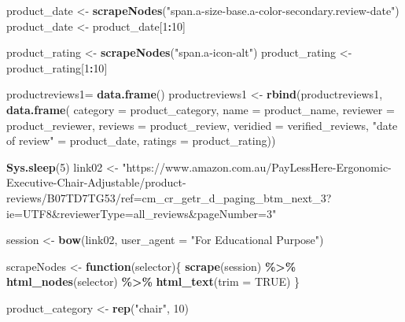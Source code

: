 \documentclass[
]{article}
\newenvironment{Shaded}{\begin{snugshade}}{\end{snugshade}}
\newcommand{\AttributeTok}[1]{\textcolor[rgb]{0.13,0.29,0.53}{#1}}
\newcommand{\ConstantTok}[1]{\textcolor[rgb]{0.56,0.35,0.01}{#1}}
\newcommand{\ControlFlowTok}[1]{\textcolor[rgb]{0.13,0.29,0.53}{\textbf{#1}}}
\newcommand{\DecValTok}[1]{\textcolor[rgb]{0.00,0.00,0.81}{#1}}
\newcommand{\FunctionTok}[1]{\textcolor[rgb]{0.13,0.29,0.53}{\textbf{#1}}}
\newcommand{\NormalTok}[1]{#1}
\newcommand{\OtherTok}[1]{\textcolor[rgb]{0.56,0.35,0.01}{#1}}
\newcommand{\SpecialCharTok}[1]{\textcolor[rgb]{0.81,0.36,0.00}{\textbf{#1}}}
\newcommand{\StringTok}[1]{\textcolor[rgb]{0.31,0.60,0.02}{#1}}
\begin{document}
\begin{Shaded}
\begin{Highlighting}[]
\NormalTok{  product\_date }\OtherTok{\textless{}{-}} \FunctionTok{scrapeNodes}\NormalTok{(}\StringTok{"span.a{-}size{-}base.a{-}color{-}secondary.review{-}date"}\NormalTok{)}
\NormalTok{  product\_date }\OtherTok{\textless{}{-}}\NormalTok{ product\_date[}\DecValTok{1}\SpecialCharTok{:}\DecValTok{10}\NormalTok{]}
  
\NormalTok{  product\_rating }\OtherTok{\textless{}{-}} \FunctionTok{scrapeNodes}\NormalTok{(}\StringTok{"span.a{-}icon{-}alt"}\NormalTok{)}
\NormalTok{  product\_rating }\OtherTok{\textless{}{-}}\NormalTok{ product\_rating[}\DecValTok{1}\SpecialCharTok{:}\DecValTok{10}\NormalTok{]}
  
\NormalTok{  productreviews1}\OtherTok{=} \FunctionTok{data.frame}\NormalTok{()}
\NormalTok{  productreviews1 }\OtherTok{\textless{}{-}} \FunctionTok{rbind}\NormalTok{(productreviews1, }\FunctionTok{data.frame}\NormalTok{(}
                      \AttributeTok{category =}\NormalTok{ product\_category,}
                      \AttributeTok{name =}\NormalTok{ product\_name,}
                      \AttributeTok{reviewer =}\NormalTok{ product\_reviewer,}
                      \AttributeTok{reviews =}\NormalTok{ product\_review,}
                      \AttributeTok{veridied =}\NormalTok{ verified\_reviews,}
                      \StringTok{"date of review"} \OtherTok{=}\NormalTok{ product\_date,}
                      \AttributeTok{ratings =}\NormalTok{ product\_rating))}

  
 \FunctionTok{Sys.sleep}\NormalTok{(}\DecValTok{5}\NormalTok{)}
\NormalTok{link02 }\OtherTok{\textless{}{-}} \StringTok{"https://www.amazon.com.au/PayLessHere{-}Ergonomic{-}Executive{-}Chair{-}Adjustable/product{-}reviews/B07TD7TG53/ref=cm\_cr\_getr\_d\_paging\_btm\_next\_3?ie=UTF8\&reviewerType=all\_reviews\&pageNumber=3"}


\NormalTok{  session }\OtherTok{\textless{}{-}} \FunctionTok{bow}\NormalTok{(link02,}
               \AttributeTok{user\_agent =} \StringTok{"For Educational Purpose"}\NormalTok{)}

\NormalTok{  scrapeNodes }\OtherTok{\textless{}{-}} \ControlFlowTok{function}\NormalTok{(selector)\{}
    \FunctionTok{scrape}\NormalTok{(session) }\SpecialCharTok{\%\textgreater{}\%}
      \FunctionTok{html\_nodes}\NormalTok{(selector) }\SpecialCharTok{\%\textgreater{}\%}
      \FunctionTok{html\_text}\NormalTok{(}\AttributeTok{trim =} \ConstantTok{TRUE}\NormalTok{)}
\NormalTok{  \}}

\NormalTok{  product\_category }\OtherTok{\textless{}{-}} \FunctionTok{rep}\NormalTok{(}\StringTok{"chair"}\NormalTok{, }\DecValTok{10}\NormalTok{)}


\end{Highlighting}
\end{Shaded}
\end{document}
